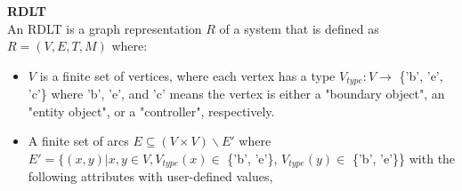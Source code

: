 \begin{defn}\textbf{RDLT} \cite{Malinao2017}\\
    \label{RDLTDef}
    An RDLT is a graph representation \begin{math}R\end{math} of a system that is defined as \begin{math}R = (V, E, T, M)\end{math} where:
    \begin{itemize}
        \item \begin{math}V\end{math} is a finite set of vertices, where each vertex has a type \begin{math}V_{type}: V \rightarrow \end{math} \{'b', 'e', 'c'\} where 'b', 'e', and 'c' means the vertex is either a "boundary object", an "entity object", or a "controller", respectively.
        
        \item A finite set of arcs \begin{math}E \subseteq (V \times V) \backslash  E'\end{math} where \begin{math}E' = \{(x,y) | x,y \in V, V_{type}(x) \in \end{math} \{'b', 'e'\}, \begin{math}V_{type}(y) \in \end{math} \{'b', 'e'\}\} with the following attributes with user-defined values,
            

\end{itemize}
\end{defn}
